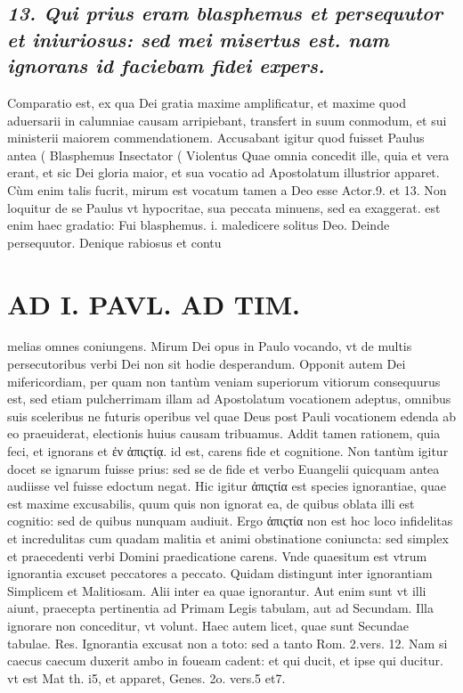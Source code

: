 \documentclass{article}
\begin{document}
\begin{pages}
\subsection*{\textit{13. Qui prius eram blasphemus et persequutor et iniuriosus: sed mei misertus est. nam ignorans id faciebam fidei expers. }}\pstart Comparatio est, ex qua Dei gratia maxime amplificatur, et maxime quod aduersarii in calumniae causam arripiebant, transfert in suum conmodum, et sui ministerii maiorem commendationem. Accusabant igitur quod fuisset Paulus antea ( Blasphemus Insectator ( Violentus Quae omnia concedit ille, quia et vera erant, et sic Dei gloria maior, et sua vocatio ad Apostolatum illustrior apparet. Cùm enim talis fucrit, mirum est vocatum tamen a Deo esse Actor.9. et 13. Non loquitur de se Paulus vt hypocritae, sua peccata minuens, sed ea exaggerat. est enim haec gradatio: Fui blasphemus. i. maledicere solitus Deo. Deinde persequutor. Denique rabiosus et contu\pend
\section*{AD I. PAVL. AD TIM. }
\marginpar{[ p.26 ]}\pstart melias omnes coniungens. Mirum Dei opus in Paulo vocando, vt de multis persecutoribus verbi Dei non sit hodie desperandum. Opponit autem Dei mifericordiam, per quam non tantùm veniam superiorum vitiorum consequurus est, sed etiam pulcherrimam illam ad Apostolatum vocationem adeptus, omnibus suis sceleribus ne futuris operibus vel quae Deus post Pauli vocationem edenda ab eo praeuiderat, electionis huius causam tribuamus.  \pend\pstart Addit tamen rationem, quia feci, et ignorans et ἐν ἀπιςτίᾳ. id est, carens fide et cognitione. Non tantùm igitur docet se ignarum fuisse prius: sed se de fide et verbo Euangelii quicquam antea audiisse vel fuisse edoctum negat. Hic igitur ἀπιςτία est species ignorantiae, quae est maxime excusabilis, quum quis non ignorat ea, de quibus oblata illi est cognitio: sed de quibus nunquam audiuit. Ergo ἀπιςτία non est hoc loco infidelitas et incredulitas cum quadam malitia et animi obstinatione coniuncta: sed simplex et praecedenti verbi Domini praedicatione carens. Vnde quaesitum est vtrum ignorantia excuset peccatores a peccato. Quidam distingunt inter ignorantiam Simplicem et Malitiosam. Alii inter ea quae ignorantur. Aut enim sunt vt illi aiunt, praecepta pertinentia ad Primam Legis tabulam, aut ad Secundam. Illa ignorare non conceditur, vt volunt. Haec autem licet, quae sunt Secundae tabulae. Res. Ignorantia excusat non a toto: sed a tanto Rom. 2.vers. 12. Nam si caecus caecum duxerit ambo in foueam cadent: et qui ducit, et ipse qui ducitur. vt est Mat th. i5, et apparet, Genes. 2o. vers.5 et7.  \pend

\end{pages}
\end{document}
